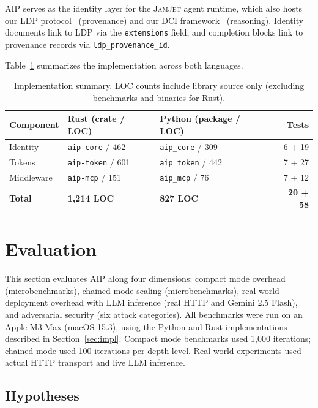 \documentclass[11pt,a4paper]{article}
\newcommand{\aip}{\textsc{AIP}}
\newcommand{\ldp}{\textsc{LDP}}
\newcommand{\dci}{\textsc{DCI}}
\newcommand{\jamjet}{\textsc{JamJet}}
\begin{document}
\aip{} serves as the identity layer for the \jamjet{} agent runtime, which also hosts our \ldp{} protocol~\citep{prakash2025ldp} (provenance) and our \dci{} framework~\citep{prakash2025dci} (reasoning). Identity documents link to \ldp{} via the \texttt{extensions} field, and completion blocks link to provenance records via \texttt{ldp\_provenance\_id}.

Table~\ref{tab:impl} summarizes the implementation across both languages.

\begin{table}[t]
\centering
\caption{Implementation summary. LOC counts include library source only (excluding benchmarks and binaries for Rust).}
\label{tab:impl}
\footnotesize
\begin{tabular}{@{}lllr@{}}
\toprule
\textbf{Component} & \textbf{Rust (crate / LOC)} & \textbf{Python (package / LOC)} & \textbf{Tests} \\
\midrule
Identity   & \texttt{aip-core} / 462  & \texttt{aip\_core} / 309  & 6 + 19 \\
Tokens     & \texttt{aip-token} / 601 & \texttt{aip\_token} / 442 & 7 + 27 \\
Middleware & \texttt{aip-mcp} / 151   & \texttt{aip\_mcp} / 76    & 7 + 12 \\
\midrule
\textbf{Total} & \textbf{1,214 LOC} & \textbf{827 LOC} & \textbf{20 + 58} \\
\bottomrule
\end{tabular}
\end{table}

\section{Evaluation}
\label{sec:eval}

This section evaluates \aip{} along four dimensions: compact mode overhead (microbenchmarks), chained mode scaling (microbenchmarks), real-world deployment overhead with LLM inference (real HTTP and Gemini 2.5 Flash), and adversarial security (six attack categories). All benchmarks were run on an Apple M3 Max (macOS 15.3), using the Python and Rust implementations described in Section~\ref{sec:impl}. Compact mode benchmarks used 1,000 iterations; chained mode used 100 iterations per depth level. Real-world experiments used actual HTTP transport and live LLM inference.

\subsection{Hypotheses}
\label{sec:hypotheses}
\end{document}

